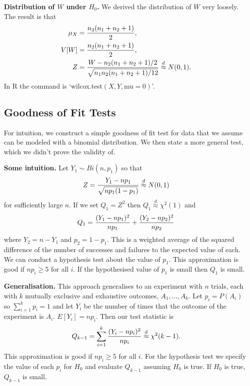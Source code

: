 \documentclass[10pt, two column]{article}
\begin{document}
{\bf Distribution of $W$ under $H_{0}$.} We derived the distribution of $W$ very loosely. The result is that \vspace{-6pt}
\begin{align*}
\mu_{X} &= \frac{n_{2}(n_{1} + n_{2} + 1)}{2}, \\
V[W] &= \frac{n_{2}(n_{1} + n_{2} + 1)}{2}, \\
Z &= \frac{W - n_{2}(n_{1} + n_{2} + 1)/2}{\sqrt{n_{1}n_{2}(n_{1} + n_{2} + 1)/12}} \stackrel{d}{\approx} N(0,1). \vspace{-6pt}
\end{align*}
In R the command is `wilcox.test$(X,Y,\text{mu}=0)$'. 

\subsection{Goodness of Fit Tests}

For intuition, we construct a simple goodness of fit test for data that we assume can be modeled with a binomial distribution. We then state a more general test, which we didn't prove the validity of. 

{\bf Some intuition.} Let $Y_{1} \sim Bi(n,p_{1})$ so that \vspace{-6pt}
\[
Z = \frac{Y_{1} - np_{1}}{\sqrt{np_{1}(1 - p_{1})}} \stackrel{d}{\approx} N(0,1) \vspace{-12pt}
\]  
for sufficiently large $n$. If we set $Q_{1} = Z^{2}$ then $Q_{1} \stackrel{d}{\approx} \chi^{2}(1)$ and
\[
Q_{1} = \frac{(Y_{1} - np_{1})^{2}}{np_{1}} + \frac{(Y_{2} - np_{2})^{2}}{np_{2}} \vspace{-6pt}
\]  
where $Y_{2} = n - Y_{1}$ and $p_{2} = 1 - p_{1}$. This is a weighted average of the squared difference of the number of successes and failures to the expected value of each. We can conduct a hypothesis test about the value of $p_{1}$. This approximation is good if $np_{i} \geq 5$ for all $i$. If the hypothesised value of $p_{1}$ is small then $Q_{1}$ is small.      

{\bf Generalisation.} This approach generalises to an experiment with $n$ trials, each with $k$ mutually exclusive and exhaustive outcomes, $A_{1}, \dots, A_{k}$. Let $p_{i} = P(A_{i})$ so $\sum_{i=1}^{k} p_{i} = 1$ and let $Y_{i}$ be the number of times that the outcome of the experiment is $A_{i}$. $E[Y_{i}] = np_{i}$. Then our test statistic is \vspace{-6pt}
\[
Q_{k-1} = \sum_{i=1}^{k} \frac{(Y_{i}-np_{i})^{2}}{np_{i}} \stackrel{d}{\approx} \chi^{2}(k-1). \vspace{-6pt}
\]  
This approximation is good if $np_{i} \geq 5$ for all $i$. For the hypothesis test we specify the value of each $p_{i}$ for $H_{0}$ and evaluate $Q_{k-1}$ assuming $H_{0}$ is true. If $H_{0}$ is true, $Q_{k-1}$ is small. 
\end{document}

